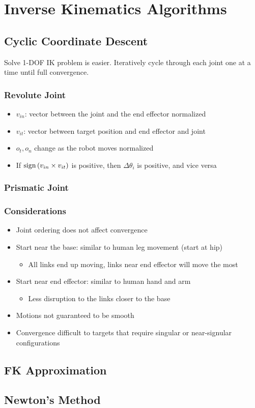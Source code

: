 \chapter{Inverse Kinematics Algorithms}

\section{Cyclic Coordinate Descent}

  Solve 1-DOF IK problem is easier. Iteratively cycle through each joint
  one at a time until full convergence.

  \subsection{Revolute Joint}

    \begin{itemize}
      \item $ v_{in} $: vector between the joint and the end effector normalized
      \item $ v_{it} $: vector between target position and end effector and joint
      \item $ o_{t}, o_{n} $ change as the robot moves
      normalized
      \item If $ \operatorname{sign}\left( v_{in} \times v_{it} \right) $ is positive, then
      $ \Delta \theta_{i} $ is positive, and vice versa
    \end{itemize}

  \subsection{Prismatic Joint}

  \subsection{Considerations}

    \begin{itemize}
      \item Joint ordering does not affect convergence
      \item Start near the base: similar to human leg movement (start at hip)
      \begin{itemize}
        \item All links end up moving, links near end effector will move the most
      \end{itemize}

      \item Start near end effector: similar to human hand and arm
      \begin{itemize}
        \item Less disruption to the links closer to the base
      \end{itemize}

      \item Motions not guaranteed to be smooth
      \item Convergence difficult to targets that require singular or near-signular
      configurations
    \end{itemize}

\section{FK Approximation}

\section{Newton's Method}
